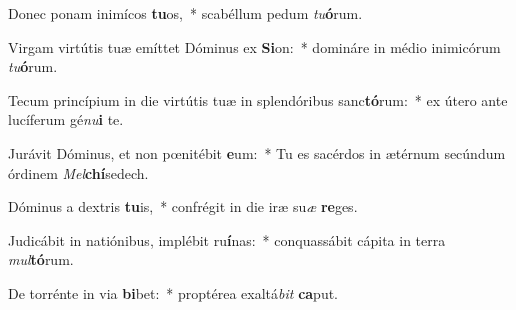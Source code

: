 \item Donec ponam inimícos \textbf{tu}os,~* scabéllum pedum \textit{tu}\textbf{ó}rum.
\item Virgam virtútis tuæ emíttet Dóminus ex \textbf{Si}on:~* domináre in médio inimicórum \textit{tu}\textbf{ó}rum.
\item Tecum princípium in die virtútis tuæ in splendóribus sanc\textbf{tó}rum:~* ex útero ante lucíferum gé\textit{nu}\textbf{i} te.
\item Jurávit Dóminus, et non pœnitébit \textbf{e}um:~* Tu es sacérdos in ætérnum secúndum órdinem \textit{Mel}\textbf{chí}sedech.
\item Dóminus a dextris \textbf{tu}is,~* confrégit in die iræ su\textit{æ} \textbf{re}ges.
\item Judicábit in natiónibus, implébit ru\textbf{í}nas:~* conquassábit cápita in terra \textit{mul}\textbf{tó}rum.
\item De torrénte in via \textbf{bi}bet:~* proptérea exaltá\textit{bit} \textbf{ca}put.
